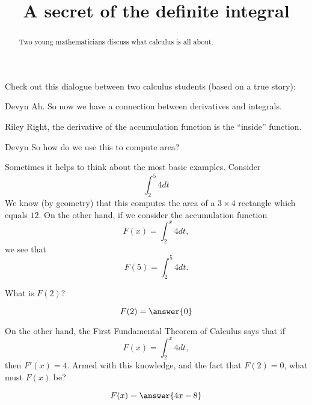 \documentclass{ximera}
\title[Break-Ground:]{A secret of the definite integral}
\begin{document}
\begin{abstract}
Two young mathematicians discuss what calculus is all about.
\end{abstract}
\maketitle


Check out this dialogue between two calculus students (based on a true
story):

\begin{dialogue}
\item[Devyn] Ah. So now we have a connection between derivatives and
  integrals.
\item[Riley] Right, the derivative of the accumulation function is the
  ``inside'' function.
\item[Devyn] So how do we use this to compute area?
\end{dialogue}

Sometimes it helps to think about the most basic examples. Consider
\[
\int_2^5 4 dt
\]
We know (by geometry) that this computes the area of a $3\times 4$
rectangle which equals $12$. On the other hand, if we consider the
accumulation function
\[
F(x) = \int_2^x 4 dt,
\]
we see that
\[
F(5) = \int_2^5 4 dt.
\]
\begin{problem}
  What is $F(2)$?
  \begin{prompt}
    \[
    F(2) = \answer{0}
    \]
  \end{prompt}
\end{problem}

\begin{problem}
  On the other hand, the First Fundamental Theorem of Calculus says that if
  \[
  F(x) = \int_2^x 4 dt,
  \]
  then $F'(x) = 4$. Armed with this knowledge, and the fact that $F(2)
  = 0$, what must $F(x)$ be?
  \begin{prompt}
    \[
    F(x) = \answer{4x-8}
    \]
  \end{prompt}
\end{problem}





%
\end{document}
